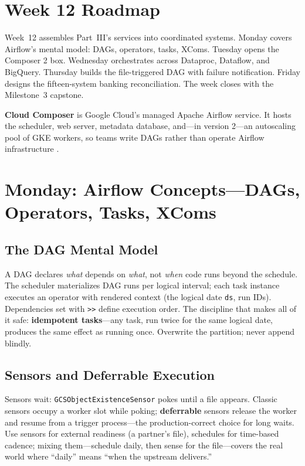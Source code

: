 \section{Week 12 Roadmap}
Week~12 assembles Part~III's services into coordinated systems. Monday covers Airflow's mental model: DAGs, operators, tasks, XComs. Tuesday opens the Composer 2 box. Wednesday orchestrates across Dataproc, Dataflow, and BigQuery. Thursday builds the file-triggered DAG with failure notification. Friday designs the fifteen-system banking reconciliation. The week closes with the Milestone~3 capstone.

\begin{definitionbox}
\textbf{Cloud Composer} is Google Cloud's managed Apache Airflow service. It hosts the scheduler, web server, metadata database, and---in version 2---an autoscaling pool of GKE workers, so teams write DAGs rather than operate Airflow infrastructure \cite{googlecloudcomposerdocs,apacheairflowdocs}.
\end{definitionbox}

\section{Monday: Airflow Concepts---DAGs, Operators, Tasks, XComs}

\subsection{The DAG Mental Model}
A DAG declares \emph{what} depends on \emph{what}, not \emph{when} code runs beyond the schedule. The scheduler materializes DAG runs per logical interval; each task instance executes an operator with rendered context (the logical date \texttt{ds}, run IDs). Dependencies set with \verb|>>| define execution order. The discipline that makes all of it safe: \textbf{idempotent tasks}---any task, run twice for the same logical date, produces the same effect as running once. Overwrite the partition; never append blindly.

\subsection{Sensors and Deferrable Execution}
Sensors wait: \texttt{GCSObjectExistenceSensor} pokes until a file appears. Classic sensors occupy a worker slot while poking; \textbf{deferrable} sensors release the worker and resume from a trigger process---the production-correct choice for long waits. Use sensors for external readiness (a partner's file), schedules for time-based cadence; mixing them---schedule daily, then sense for the file---covers the real world where ``daily'' means ``when the upstream delivers.''

